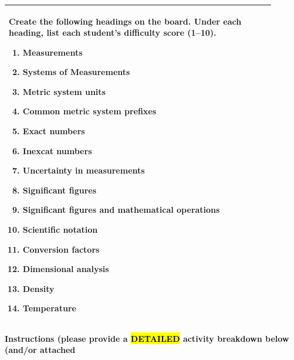 \documentclass{article}
\begin{document}
\begin{tabular}{|p{0.9\linewidth}|}
\hline

Create the following headings on the board. Under each heading, list each student’s difficulty score (1--10).

\begin{enumerate}
    \item Measurements
    \item Systems of Measurements
    \item Metric system units
    \item Common metric system prefixes
    \item Exact numbers
    \item Inexcat numbers
    \item Uncertainty in measurements
    \item Significant figures
    \item Significant figures and mathematical operations
    \item Scientific notation
    \item Conversion factors
    \item Dimensional analysis
    \item Density
    \item Temperature
\end{enumerate} \\
\hline
\end{tabular}
\newpage
{\large \textbf{Instructions (please provide a \hl{DETAILED} activity breakdown below (and/or attached}} \\[0.2em]
\end{document}

